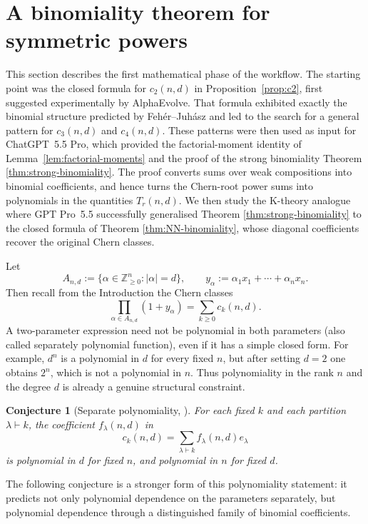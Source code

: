 \documentclass[11pt]{amsart}
\numberwithin{equation}{section}
\newtheorem{conjecture}[theorem]{Conjecture}
\theoremstyle{remark}
\newcommand{\Z}{\mathbb Z}
\begin{document}
\section{A binomiality theorem for symmetric powers}
This section describes the first mathematical phase of the workflow.  The starting point was the closed formula for $c_2(n,d)$ in Proposition~\ref{prop:c2}, first suggested experimentally by AlphaEvolve.  That formula exhibited exactly the binomial structure predicted by Feh\'er--Juh\'asz and led to the search for a general pattern for $c_3(n,d)$ and $c_4(n,d)$.  These patterns were then used as input for ChatGPT~5.5 Pro, which provided the factorial-moment
identity of Lemma~\ref{lem:factorial-moments} and the proof of the strong
binomiality Theorem \ref{thm:strong-binomiality}. The proof converts sums over weak compositions into binomial coefficients, and hence turns the Chern-root power sums into polynomials in the quantities $T_r(n,d)$. We then study the K-theory analogue where GPT Pro~5.5 successfully generalised Theorem \ref{thm:strong-binomiality} to the closed formula of Theorem \ref{thm:NN-binomiality}, whose diagonal coefficients recover the original Chern classes.

Let
\[
  A_{n,d}:=\{\alpha\in\Z_{\ge0}^n:|\alpha|=d\},\qquad
  y_\alpha:=\alpha_1x_1+\cdots+\alpha_nx_n.
\]
Then recall from the Introduction the Chern classes
\[
  \prod_{\alpha\in A_{n,d}}(1+y_\alpha)=\sum_{k\ge0}c_k(n,d).
\]
A two-parameter expression need not be polynomial in both parameters (also called separately polynomial function), even if it has a simple closed form.  For example, $d^n$ is a polynomial in $d$ for every fixed $n$, but after setting $d=2$ one obtains $2^n$, which is not a polynomial in $n$.  Thus polynomiality in the rank $n$ and the degree $d$ is already a genuine structural constraint.

\begin{conjecture}[Separate polynomiality, \cite{feher2025polynomiality}]\label{conj:polynomiality}
For each fixed $k$ and each partition $\lambda\vdash k$, the coefficient $f_\lambda(n,d)$ in
\[
  c_k(n,d)=\sum_{\lambda\vdash k}f_\lambda(n,d)e_\lambda
\]
is polynomial in $d$ for fixed $n$, and polynomial in $n$ for fixed $d$.
\end{conjecture}

The following conjecture is a stronger form of this polynomiality statement: it predicts not only polynomial dependence on the parameters separately, but polynomial dependence through a distinguished family of binomial coefficients.
\end{document}
